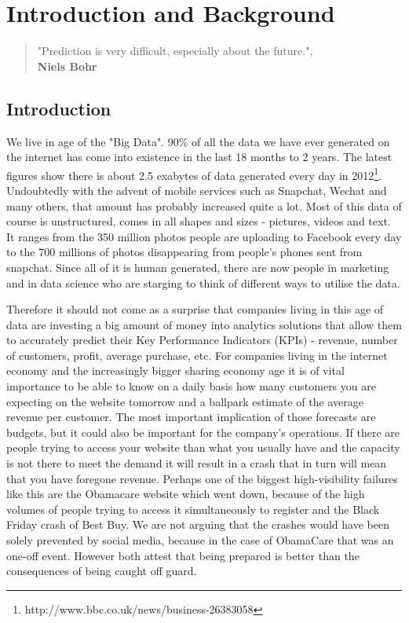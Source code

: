 \documentclass[minf,twoside,singlespacing,parskip,frontabs,notimes,12pt]{infthesis} %
\begin{document}
\tableofcontents


\chapter{Introduction and Background}

\begin{quotation}
"Prediction is very difficult, especially about the future.", \\
\textbf{Niels Bohr}
\end{quotation}

\section{Introduction}

We live in age of the "Big Data". 90\% of all the data we have ever generated on the internet has come into existence in the last 18 months to 2 years. 
The latest figures show there is about 2.5 exabytes of data generated every day in 2012\footnote{http://www.bbc.co.uk/news/business-26383058}. 
Undoubtedly with the advent of mobile services such as Snapchat, Wechat and many others, that amount has probably increased quite a lot. 
Most of this data of course is unstructured, comes in all shapes and sizes - pictures, videos and text. 
It ranges from the 350 million photos people are uploading to Facebook every day\cite{InternetOrgWhitepaper} to the 700 millions of photos disappearing from people's phones sent from snapchat\cite{snapchat}. 
Since all of it is human generated, there are now people in marketing and in data science who are starging to think of different ways to utilise the data. 

Therefore it should not come as a surprise that  companies living in this age of data are investing a big amount of money into analytics solutions that allow them to accurately predict their Key Performance Indicators (KPIs) - revenue, number of customers, profit, average purchase, etc. 
For companies living in the internet economy and the increasingly bigger sharing economy age it is of vital importance to be able to know on a daily basis how many customers you are expecting on the website tomorrow and a ballpark estimate of the average revenue per customer. 
The most important implication of those forecasts are budgets, but it could also be important for the company's operations. If there are people trying to access your website than what you usually have and the capacity is not there to meet the demand it will result in a crash that in turn will mean that you have foregone revenue. 
Perhaps one of the biggest high-visibility failures like this are the Obamacare website\cite{obcare} which went down, because of the high volumes of people trying to access it simultaneously to register  and the Black Friday crash of Best Buy\cite{bestbuy}. 
We are not arguing that the crashes would have been solely prevented by social media, because in the case of ObamaCare that was an one-off event. However both attest that being prepared is better than the consequences of being caught off guard. 
\end{document}
